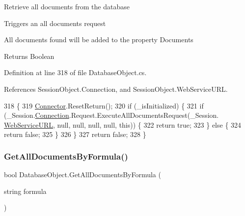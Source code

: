 Retrieve all documents from the database 

Triggers an all documents request

All documents found will be added to the property \textquotesingle{}Documents\textquotesingle{}

\begin{DoxyReturn}{Returns}
Boolean
\end{DoxyReturn}


Definition at line 318 of file Database\+Object.\+cs.



References Session\+Object.\+Connection, and Session\+Object.\+Web\+Service\+U\+RL.


\begin{DoxyCode}
318                                   \{
319         \hyperlink{class_connector}{Connector}.ResetReturn();
320         \textcolor{keywordflow}{if} (\_isInitialized) \{
321             \textcolor{keywordflow}{if} (\_Session.\hyperlink{class_session_object_a014bdbf705a753540e19bfb53030c55c}{Connection}.Request.ExecuteAllDocumentsRequest(\_Session.
      \hyperlink{class_session_object_a697c071c812fbf7ad1166b896fb44c16}{WebServiceURL}, null, null, null, null, \textcolor{keyword}{this})) \{
322                 \textcolor{keywordflow}{return} \textcolor{keyword}{true};
323             \} \textcolor{keywordflow}{else} \{
324                 \textcolor{keywordflow}{return} \textcolor{keyword}{false};
325             \}
326         \}
327         \textcolor{keywordflow}{return} \textcolor{keyword}{false};
328     \}
\end{DoxyCode}
\mbox{\label{class_database_object_a6bfb480373a7e2bdbeaa67e4e3303a3a}} 
\subsubsection{\texorpdfstring{Get\+All\+Documents\+By\+Formula()}{GetAllDocumentsByFormula()}}
{\footnotesize\ttfamily bool Database\+Object.\+Get\+All\+Documents\+By\+Formula (\begin{DoxyParamCaption}\item[{string}]{formula }\end{DoxyParamCaption})}



